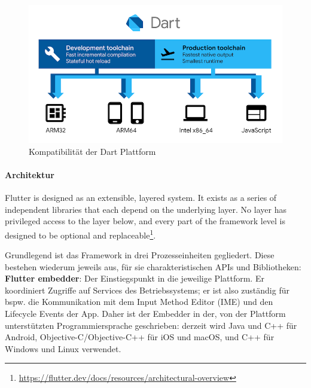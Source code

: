 \begin{figure}[tbt]
	\begin{center}
		\includegraphics[scale=0.45]{Theoretische_Grundlagen/images/dart-diagram.png}
	\end{center}
	\caption[Kompatibilität der Dart Plattform]{Kompatibilität der Dart Plattform \protect \footnotemark}
	\label{fig:dart_plattform}
\end{figure}

\paragraph{Architektur}
\begin{displayquote}
	Flutter is designed as an extensible, layered system. It exists as a series of independent libraries that each depend on the underlying layer. No layer has privileged access to the layer below, and every part of the framework level is designed to be optional and replaceable\footnote{\url{https://flutter.dev/docs/resources/architectural-overview}}.
\end{displayquote}

\noindent
Grundlegend ist das Framework in drei Prozesseinheiten gegliedert. Diese bestehen wiederum jeweils aus, für sie charakteristischen APIs und Bibliotheken:\\

\noindent
{}
\textbf{Flutter embedder}: Der Einstiegspunkt in die jeweilige Plattform. Er koordiniert Zugriffe auf Services des Betriebssystems; er ist also zuständig für bspw. die Kommunikation mit dem Input Method Editor (IME) und den Lifecycle Events der App. Daher ist der Embedder in der, von der Plattform unterstützten Programmiersprache geschrieben: derzeit wird Java und C++ für Android, Objective-C/Objective-C++ für iOS und macOS, und C++ für Windows und Linux verwendet.\\

